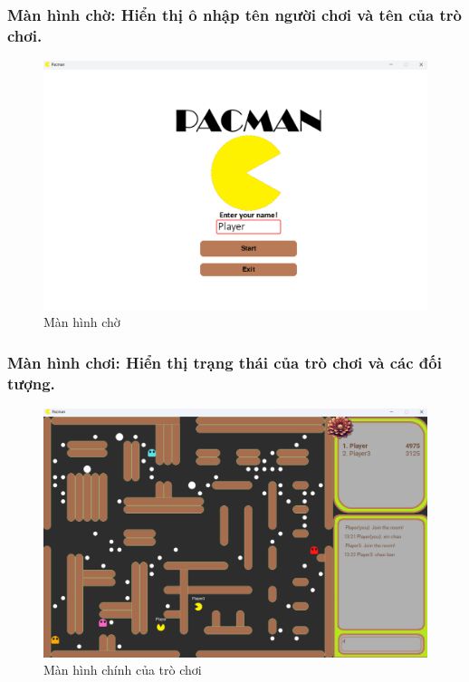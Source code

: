 \documentclass[a4paper]{article}
\begin{document}
\subsubsection{Màn hình chờ: Hiển thị ô nhập tên người chơi và tên của trò chơi.}
\begin{figure}[h!]
    \centering
    \includegraphics[width=1\linewidth]{manHinhCho.png}
    \caption{Màn hình chờ}
\end{figure}

\newpage
\subsubsection{Màn hình chơi: Hiển thị trạng thái của trò chơi và các đối tượng.}
\begin{figure}[h!]
    \centering
    \includegraphics[width=1\linewidth]{manHinhTroChoi.png}
    \caption{Màn hình chính của trò chơi}
\end{figure}
\end{document}
